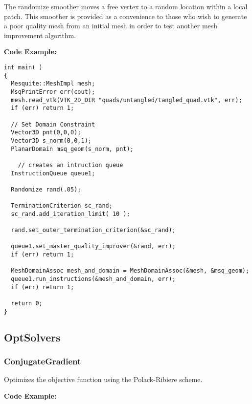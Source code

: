 The randomize smoother moves a free vertex to a random location within a local patch.  This smoother is provided as a convenience to
those who wish to generate a poor quality mesh from an initial mesh in order to test another mesh improvement algorithm.

\textbf{Code Example:}

\begin{lstlisting}[frame=single]
int main( )
{
  Mesquite::MeshImpl mesh;
  MsqPrintError err(cout);
  mesh.read_vtk(VTK_2D_DIR "quads/untangled/tangled_quad.vtk", err);
  if (err) return 1;
  
  // Set Domain Constraint
  Vector3D pnt(0,0,0);
  Vector3D s_norm(0,0,1);
  PlanarDomain msq_geom(s_norm, pnt);
                                                                              
    // creates an intruction queue
  InstructionQueue queue1;
  
  Randomize rand(.05);
  
  TerminationCriterion sc_rand;
  sc_rand.add_iteration_limit( 10 );
 
  rand.set_outer_termination_criterion(&sc_rand);
  
  queue1.set_master_quality_improver(&rand, err);
  if (err) return 1;

  MeshDomainAssoc mesh_and_domain = MeshDomainAssoc(&mesh, &msq_geom);
  queue1.run_instructions(&mesh_and_domain, err);
  if (err) return 1;
  
  return 0;
}
\end{lstlisting}


\subsection{OptSolvers}

\subsubsection{ConjugateGradient}

Optimizes the objective function using the Polack-Ribiere scheme.

\textbf{Code Example:}

